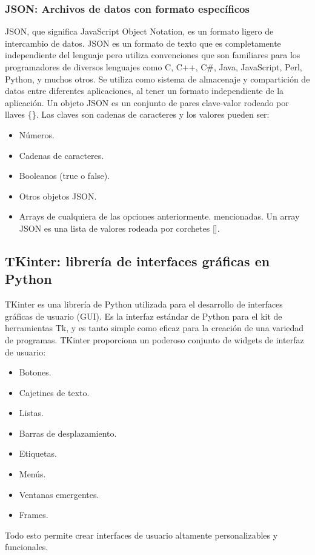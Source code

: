         \subsubsection{JSON: Archivos de datos con formato específicos}
        JSON, que significa JavaScript Object Notation, es un formato ligero de intercambio de datos. JSON es un formato de texto que es completamente independiente del lenguaje pero utiliza convenciones que son familiares para los programadores de diversos lenguajes como C, C++, C\#, Java, JavaScript, Perl, Python, y muchos otros. Se utiliza como sistema de almacenaje y compartición de datos entre diferentes aplicaciones, al tener un formato independiente de la aplicación.
            Un objeto JSON es un conjunto de pares clave-valor rodeado por llaves \{\}. Las claves son cadenas de caracteres y los valores pueden ser:
            \begin{itemize}
                \item Números.
                \item Cadenas de caracteres.
                \item Booleanos (true o false).
                \item Otros objetos JSON.
                \item Arrays de cualquiera de las opciones anteriormente. mencionadas. Un array JSON es una lista de valores rodeada por corchetes [].
            \end{itemize}

    \subsection{TKinter:  librería de interfaces gráficas en Python}
    TKinter \cite{wiki:tkinter} es una librería de Python utilizada para el desarrollo de interfaces gráficas de usuario (GUI). Es la interfaz estándar de Python para el kit de herramientas Tk, y es tanto simple como eficaz para la creación de una variedad de programas. TKinter proporciona un poderoso conjunto de widgets de interfaz de usuario:
    \begin{itemize}
        \item Botones.
        \item Cajetines de texto.
        \item Listas.
        \item Barras de desplazamiento.
        \item Etiquetas.
        \item Menús.
        \item Ventanas emergentes.
        \item Frames.
    \end{itemize}
    Todo esto permite crear interfaces de usuario altamente personalizables y funcionales.  

